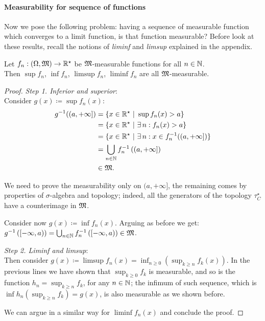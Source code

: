 \paragraph{Measurability for sequence of functions} Now we pose the following problem: having a sequence of measurable function which converges to a limit function, is that function measurable? Before look at these results, recall the notions of \textit{liminf} and \textit{limsup} explained in the appendix.

\begin{theo} \label{lim-are-measurable}
	Let $f_n:\left(\Omega,\mathfrak M\right)\to \mathbb R^\star$ be $\mathfrak M$-measurable functions for all $n \in \mathbb N$. \\
	Then $\sup f_n$, $\inf f_n$, $\limsup f_n$,  $\liminf f_n$ are all $\mathfrak M$-measurable.
\end{theo}
\begin{proof}
	\textit{Step 1. Inferior and superior}:\\ Consider $g(x) \coloneqq \sup f_n(x)$:
	\begin{align*}
	g^{-1}((a, +\infty])
	& = \{ x \in \mathbb R^\star \ |\ \sup f_n(x) > a \}\\
	& = \{ x \in \mathbb R^\star \ |\ \exists \, n : f_n(x) > a \} \\
	& = \{ x \in \mathbb R^\star \ |\ \exists \, n : x \in f_n^{-1}((a, +\infty]) \} \\
	& = \bigcup_{n\in\mathbb N}f_n^{-1}\left(\left(a,+\infty\right]\right)\\
	& \in\mathfrak M
	.
	\end{align*}

	We need to prove the measurability only on $(a, +\infty]$, the remaining comes by properties of $\sigma$-algebra and topology; indeed, all the generators of the topology $\tau_C^\star$ have a counterimage in $\mathfrak M$.
	
	Consider now $g(x) \coloneqq \inf f_n(x)$. Arguing as before we get: $g^{-1}\left(\left[-\infty,a\right)\right) = \bigcup_{n\in\mathbb N}f_n^{-1}\left(\left[-\infty,a\right)\right)\in\mathfrak M$.
	
	\textit{Step 2. Liminf and limsup}:\\
	Then consider $g(x) \coloneqq \limsup f_n(x) = \inf_{n\ge 0}\left(\sup_{k\geq n} f_k(x) \right)$.
	In the previous lines we have shown that $\sup_{k \geq 0} f_k$ is measurable, and so is the function $h_n = \sup_{k \geq n} f_k$, for any $n \in \mathbb N$; the infimum of such sequence, which is $\inf h_n \left(\sup_{k \geq n} f_k\right) = g(x)$, is also measurable as we shown before.
	
	We can argue in a similar way for $\liminf f_n(x)$ and conclude the proof.
\end{proof}

